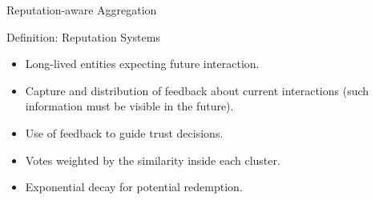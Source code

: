 \begin{frame}{Reputation-aware Aggregation}

  \begin{block}{Definition: Reputation Systems\normalfont~\autocite{resnick_Reputationsystems_2000}}
    \begin{itemize}
      \item Long-lived entities expecting future interaction.
      \item Capture and distribution of feedback about current interactions (such information must be visible in the future).
      \item Use of feedback to guide trust decisions.
    \end{itemize}
  \end{block}

  \pause
  \begin{itemize}
    \item Votes weighted by the similarity inside each cluster.
    \item Exponential decay for potential redemption.
  \end{itemize}

\end{frame}

